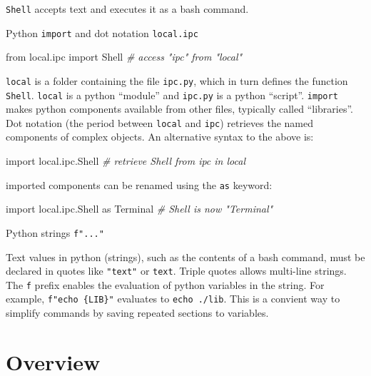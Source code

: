 \documentclass[
]{book}
\newenvironment{Shaded}{\begin{snugshade}}{\end{snugshade}}
\newcommand{\CommentTok}[1]{\textcolor[rgb]{0.56,0.35,0.01}{\textit{#1}}}
\newcommand{\ImportTok}[1]{#1}
\newcommand{\NormalTok}[1]{#1}
\begin{document}
\texttt{Shell} accepts text and executes it as a bash command.

Python \texttt{import} and dot notation \texttt{local.ipc}

\begin{Shaded}
\begin{Highlighting}[numbers=left,,]
\ImportTok{from}\NormalTok{ local.ipc }\ImportTok{import}\NormalTok{ Shell }\CommentTok{\# access "ipc" from "local"}
\end{Highlighting}
\end{Shaded}

\texttt{local} is a folder containing the file \texttt{ipc.py}, which in turn defines the function \texttt{Shell}.
\texttt{local} is a python ``module'' and \texttt{ipc.py} is a python ``script''.
\texttt{import} makes python components available from other files, typically called ``libraries''.
Dot notation (the period between \texttt{local} and \texttt{ipc}) retrieves the named components of complex objects.
An alternative syntax to the above is:

\begin{Shaded}
\begin{Highlighting}[numbers=left,,]
\ImportTok{import}\NormalTok{ local.ipc.Shell }\CommentTok{\# retrieve Shell from ipc in local}
\end{Highlighting}
\end{Shaded}

imported components can be renamed using the \texttt{as} keyword:

\begin{Shaded}
\begin{Highlighting}[numbers=left,,]
\ImportTok{import}\NormalTok{ local.ipc.Shell }\ImportTok{as}\NormalTok{ Terminal }\CommentTok{\# Shell is now "Terminal"}
\end{Highlighting}
\end{Shaded}

Python strings \texttt{f"..."}

Text values in python (strings), such as the contents of a bash command, must be declared in quotes like \texttt{"text"} or \texttt{\textquotesingle{}text\textquotesingle{}}.
Triple quotes allows multi-line strings. The \texttt{f} prefix enables the evaluation of python variables in the string.
For example, \texttt{f"echo\ \{LIB\}"} evaluates to \texttt{echo\ ./lib}.
This is a convient way to simplify commands by saving repeated sections to variables.

\section{Overview}\label{overview-1}
\end{document}
